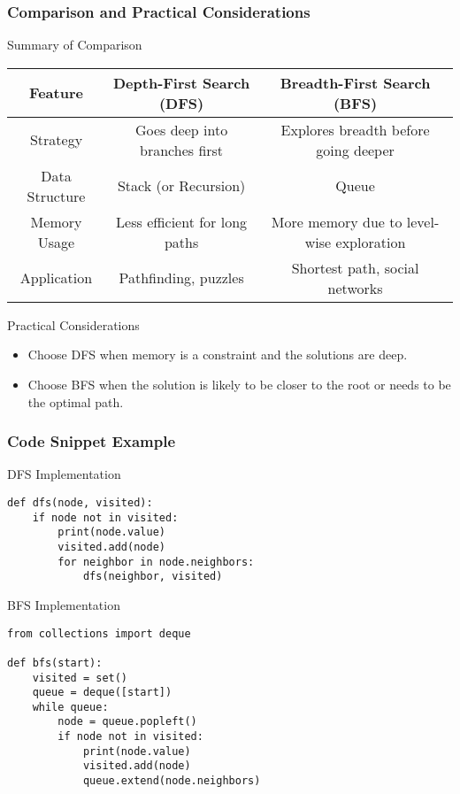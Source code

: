 \documentclass[aspectratio=169]{beamer}
\begin{document}
\begin{frame}
    \frametitle{Comparison and Practical Considerations}
    \begin{block}{Summary of Comparison}
        \begin{tabular}{|c|c|c|}
            \hline
            Feature & Depth-First Search (DFS) & Breadth-First Search (BFS) \\
            \hline
            Strategy & Goes deep into branches first & Explores breadth before going deeper \\
            \hline
            Data Structure & Stack (or Recursion) & Queue \\
            \hline
            Memory Usage & Less efficient for long paths & More memory due to level-wise exploration \\
            \hline
            Application & Pathfinding, puzzles & Shortest path, social networks \\
            \hline
        \end{tabular}
    \end{block}

    \begin{block}{Practical Considerations}
        \begin{itemize}
            \item Choose DFS when memory is a constraint and the solutions are deep.
            \item Choose BFS when the solution is likely to be closer to the root or needs to be the optimal path.
        \end{itemize}
    \end{block}
\end{frame}

\begin{frame}[fragile]
    \frametitle{Code Snippet Example}
    \begin{block}{DFS Implementation}
        \begin{lstlisting}
def dfs(node, visited):
    if node not in visited:
        print(node.value)
        visited.add(node)
        for neighbor in node.neighbors:
            dfs(neighbor, visited)
        \end{lstlisting}
    \end{block}

    \begin{block}{BFS Implementation}
        \begin{lstlisting}
from collections import deque

def bfs(start):
    visited = set()
    queue = deque([start])
    while queue:
        node = queue.popleft()
        if node not in visited:
            print(node.value)
            visited.add(node)
            queue.extend(node.neighbors)
        \end{lstlisting}
    \end{block}
\end{frame}
\end{document}
